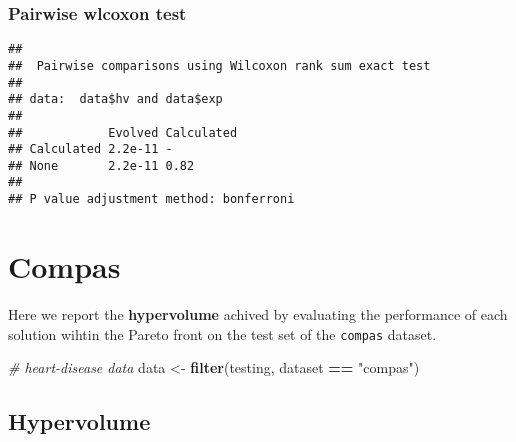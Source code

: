 \documentclass[
]{book}
\newenvironment{Shaded}{\begin{snugshade}}{\end{snugshade}}
\newcommand{\AttributeTok}[1]{\textcolor[rgb]{0.13,0.29,0.53}{#1}}
\newcommand{\CommentTok}[1]{\textcolor[rgb]{0.56,0.35,0.01}{\textit{#1}}}
\newcommand{\ConstantTok}[1]{\textcolor[rgb]{0.56,0.35,0.01}{#1}}
\newcommand{\FunctionTok}[1]{\textcolor[rgb]{0.13,0.29,0.53}{\textbf{#1}}}
\newcommand{\NormalTok}[1]{#1}
\newcommand{\OtherTok}[1]{\textcolor[rgb]{0.56,0.35,0.01}{#1}}
\newcommand{\SpecialCharTok}[1]{\textcolor[rgb]{0.81,0.36,0.00}{\textbf{#1}}}
\newcommand{\StringTok}[1]{\textcolor[rgb]{0.31,0.60,0.02}{#1}}
\begin{document}
\hypertarget{pairwise-wlcoxon-test-7}{%
\subsection{Pairwise wlcoxon test}\label{pairwise-wlcoxon-test-7}}

\begin{Shaded}
\end{Shaded}

\begin{verbatim}
## 
##  Pairwise comparisons using Wilcoxon rank sum exact test 
## 
## data:  data$hv and data$exp 
## 
##            Evolved Calculated
## Calculated 2.2e-11 -         
## None       2.2e-11 0.82      
## 
## P value adjustment method: bonferroni
\end{verbatim}

\hypertarget{compas}{%
\chapter{Compas}\label{compas}}

Here we report the \textbf{hypervolume} achived by evaluating the performance of each solution wihtin the Pareto front on the test set of the \texttt{compas} dataset.

\begin{Shaded}
\begin{Highlighting}[]
\CommentTok{\# heart{-}disease data}
\NormalTok{data }\OtherTok{\textless{}{-}} \FunctionTok{filter}\NormalTok{(testing, dataset }\SpecialCharTok{==} \StringTok{"compas"}\NormalTok{)}
\end{Highlighting}
\end{Shaded}

\hypertarget{hypervolume-8}{%
\section{Hypervolume}\label{hypervolume-8}}
\end{document}
